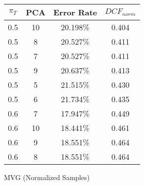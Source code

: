 \begin{tabular}{|c|c|c|c|}
\hline
$\pi_T$ & PCA & Error Rate & $DCF_{norm}$\\
\hline
0.5 & 10 & 20.198\% & 0.404\\
\hline
0.5 & 8 & 20.527\% & 0.411\\
\hline
0.5 & 7 & 20.527\% & 0.411\\
\hline
0.5 & 9 & 20.637\% & 0.413\\
\hline
0.5 & 5 & 21.515\% & 0.430\\
\hline
0.5 & 6 & 21.734\% & 0.435\\
\hline
0.6 & 7 & 17.947\% & 0.449\\
\hline
0.6 & 10 & 18.441\% & 0.461\\
\hline
0.6 & 9 & 18.551\% & 0.464\\
\hline
0.6 & 8 & 18.551\% & 0.464\\
\hline
\end{tabular}
\caption{MVG (Normalized Samples)}\label{tab:mvgn_acctable}
